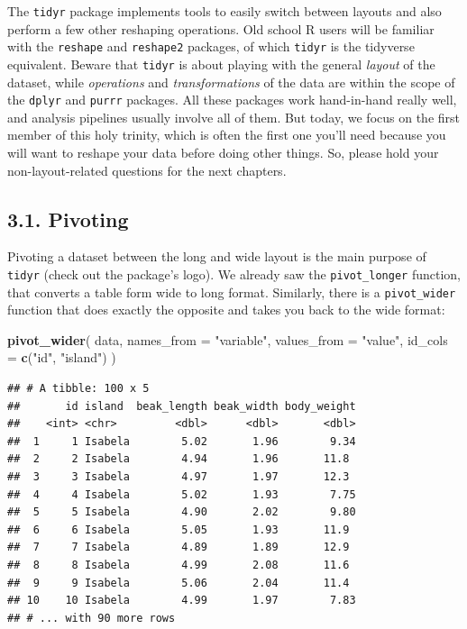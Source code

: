 \documentclass[]{book}
\newenvironment{Shaded}{}{}
\newcommand{\DataTypeTok}[1]{\textcolor[rgb]{0.56,0.13,0.00}{#1}}
\newcommand{\KeywordTok}[1]{\textcolor[rgb]{0.00,0.44,0.13}{\textbf{#1}}}
\newcommand{\NormalTok}[1]{#1}
\newcommand{\StringTok}[1]{\textcolor[rgb]{0.25,0.44,0.63}{#1}}
\begin{document}
The \texttt{tidyr} package implements tools to easily switch between layouts and also perform a few other reshaping operations. Old school R users will be familiar with the \texttt{reshape} and \texttt{reshape2} packages, of which \texttt{tidyr} is the tidyverse equivalent. Beware that \texttt{tidyr} is about playing with the general \emph{layout} of the dataset, while \emph{operations} and \emph{transformations} of the data are within the scope of the \texttt{dplyr} and \texttt{purrr} packages. All these packages work hand-in-hand really well, and analysis pipelines usually involve all of them. But today, we focus on the first member of this holy trinity, which is often the first one you'll need because you will want to reshape your data before doing other things. So, please hold your non-layout-related questions for the next chapters.

\hypertarget{pivoting}{%
\subsection{3.1. Pivoting}\label{pivoting}}

Pivoting a dataset between the long and wide layout is the main purpose of \texttt{tidyr} (check out the package's logo). We already saw the \texttt{pivot\_longer} function, that converts a table form wide to long format. Similarly, there is a \texttt{pivot\_wider} function that does exactly the opposite and takes you back to the wide format:

\begin{Shaded}
\begin{Highlighting}[]
\KeywordTok{pivot_wider}\NormalTok{(}
\NormalTok{  data, }
  \DataTypeTok{names_from =} \StringTok{"variable"}\NormalTok{, }
  \DataTypeTok{values_from =} \StringTok{"value"}\NormalTok{, }
  \DataTypeTok{id_cols =} \KeywordTok{c}\NormalTok{(}\StringTok{"id"}\NormalTok{, }\StringTok{"island"}\NormalTok{)}
\NormalTok{)}
\end{Highlighting}
\end{Shaded}

\begin{verbatim}
## # A tibble: 100 x 5
##       id island  beak_length beak_width body_weight
##    <int> <chr>         <dbl>      <dbl>       <dbl>
##  1     1 Isabela        5.02       1.96        9.34
##  2     2 Isabela        4.94       1.96       11.8 
##  3     3 Isabela        4.97       1.97       12.3 
##  4     4 Isabela        5.02       1.93        7.75
##  5     5 Isabela        4.90       2.02        9.80
##  6     6 Isabela        5.05       1.93       11.9 
##  7     7 Isabela        4.89       1.89       12.9 
##  8     8 Isabela        4.99       2.08       11.6 
##  9     9 Isabela        5.06       2.04       11.4 
## 10    10 Isabela        4.99       1.97        7.83
## # ... with 90 more rows
\end{verbatim}
\end{document}

